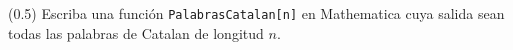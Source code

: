(0.5) Escriba una función \texttt{PalabrasCatalan[n]} en Mathematica cuya salida sean todas las palabras de Catalan de longitud $n$.
